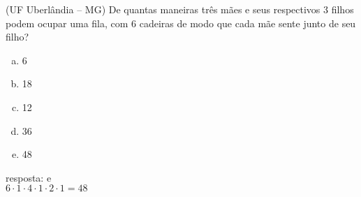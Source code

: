 \begin{ex}
(UF Uberlândia – MG) De quantas maneiras três mães e seus respectivos 3 filhos podem ocupar uma fila, com 6 cadeiras de modo que cada mãe sente junto de seu filho?
   \begin{enumerate}[(a)]
   \item 6
   \item 18
   \item 12
   \item 36
   \item 48
   \end{enumerate}
    \begin{sol}
     resposta: e\\
     $6\cdot1\cdot4\cdot1\cdot2\cdot1=48$
    \end{sol}
\end{ex}